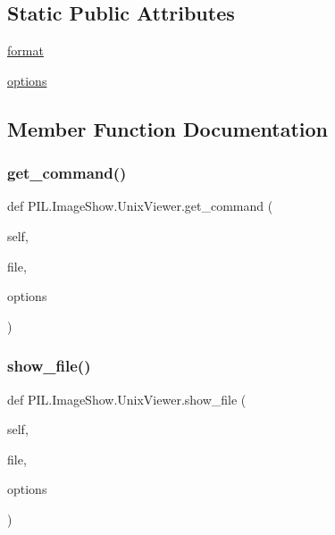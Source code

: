 \subsection*{Static Public Attributes}
\begin{DoxyCompactItemize}
\item 
\hyperlink{classPIL_1_1ImageShow_1_1UnixViewer_a5850e6b124fd4a9cf2a0286143b60a43}{format}
\item 
\hyperlink{classPIL_1_1ImageShow_1_1UnixViewer_afbac95ff1c2d0ab0858163dd7e80671e}{options}
\end{DoxyCompactItemize}


\subsection{Member Function Documentation}
\mbox{\label{classPIL_1_1ImageShow_1_1UnixViewer_aefe55625650578d9d10ccce05e6ee390}} 
\subsubsection{\texorpdfstring{get\+\_\+command()}{get\_command()}}
{\footnotesize\ttfamily def P\+I\+L.\+Image\+Show.\+Unix\+Viewer.\+get\+\_\+command (\begin{DoxyParamCaption}\item[{}]{self,  }\item[{}]{file,  }\item[{}]{options }\end{DoxyParamCaption})}

\mbox{\label{classPIL_1_1ImageShow_1_1UnixViewer_a5b6a1d7b5d10c205784f0d195fb3dab9}} 
\subsubsection{\texorpdfstring{show\+\_\+file()}{show\_file()}}
{\footnotesize\ttfamily def P\+I\+L.\+Image\+Show.\+Unix\+Viewer.\+show\+\_\+file (\begin{DoxyParamCaption}\item[{}]{self,  }\item[{}]{file,  }\item[{}]{options }\end{DoxyParamCaption})}

